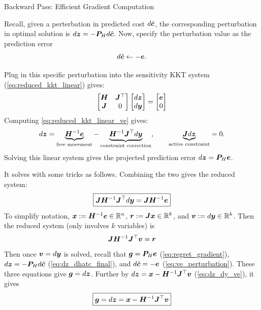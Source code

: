 \documentclass[10pt,aspectratio=169,xcolor=dvipsnames]{beamer}
\begin{document}
\begin{frame}[allowframebreaks]{Backward Pass: Efficient Gradient Computation}

    Recall, given a perterbation in predicted cost $d\hat{{\bm{c}}}$, the corresponding perturbation in optimal solution is $d{\bm{z}} = -{\bm{P}}_H d\hat{{\bm{c}}}$. Now, specify the perturbation value as the prediction error
    \begin{equation}\label{eq:ve_perturbation}
        d\hat{{\bm{c}}} \leftarrow - {\bm{e}} .
    \end{equation}

    Plug in this specific perturbation into the sensitivity KKT system (\eqref{eq:reduced_kkt_linear}) gives:
    \begin{equation}\label{eq:reduced_kkt_linear_ve}
        \begin{bmatrix}
            {\bm{H}} & {\bm{J}}^\top\\
            {\bm{J}} & 0
        \end{bmatrix}
        \begin{bmatrix}
            d{\bm{z}}\\
            d{\bm{y}}
        \end{bmatrix}
        =
        \begin{bmatrix}
            {\bm{e}}\\
            0
        \end{bmatrix}
    \end{equation}
    Computing \eqref{eq:reduced_kkt_linear_ve} gives:
    \begin{equation}\label{eq:dz_dy_ve}
        d{\bm{z}} =\underbrace{{\bm{H}}^{-1} {\bm{e}}}_{\text{free movement}} - \underbrace{{\bm{H}}^{-1} {\bm{J}}^\top d{\bm{y}}}_{\text{constraint correction}}, \qquad \underbrace{{\bm{J}} d{\bm{z}}}_{\text{active constraint}} = 0 .
    \end{equation}
    Solving this linear system gives the projected prediction error $d{\bm{z}} = {\bm{P}}_H {\bm{e}}$.

    \break

    It solves with some tricks as follows. Combining the two gives the reduced system:
    \begin{equation}\label{eq:jhjdy}
        \boxed{
            {\bm{J}} {\bm{H}}^{-1} {\bm{J}}^\top d{\bm{y}} = {\bm{J}} {\bm{H}}^{-1} {\bm{e}}
        }
    \end{equation}
    To simplify notation, ${\bm{x}}:= {\bm{H}}^{-1} {\bm{e}} \in \mathbb{R}^n$, ${\bm{r}} := {\bm{J}} {\bm{x}} \in \mathbb{R}^k$, and ${\bm{v}} := d{\bm{y}} \in \mathbb{R}^k$. Then the reduced system (only involves $k$ variables) is
    \begin{equation}
            {\bm{J}} {\bm{H}}^{-1} {\bm{J}}^\top {\bm{v}} = {\bm{r}}
    \end{equation}
    Then once ${\bm{v}} = d{\bm{y}}$ is solved, recall that ${\bm{g}} = {\bm{P}}_H {\bm{e}}$ (\eqref{eq:regret_gradient}), $d{\bm{z}} = - {\bm{P}}_H d\hat{{\bm{c}}}$ (\eqref{eq:dz_dhatc_final}), and $d\hat{{\bm{c}}} = -{\bm{e}}$ (\eqref{eq:ve_perturbation}). These three equations give ${\bm{g}} = d{\bm{z}}$. Further by $d{\bm{z}} = {\bm{x}} - {\bm{H}}^{-1} {\bm{J}}^\top {\bm{v}}$ (\eqref{eq:dz_dy_ve}), it gives
    \begin{equation}\label{eq:gdz}
        \boxed{
            {\bm{g}} = d{\bm{z}} = {\bm{x}} - {\bm{H}}^{-1} {\bm{J}}^\top {\bm{v}}
        }
    \end{equation}


\end{frame}
\end{document}
